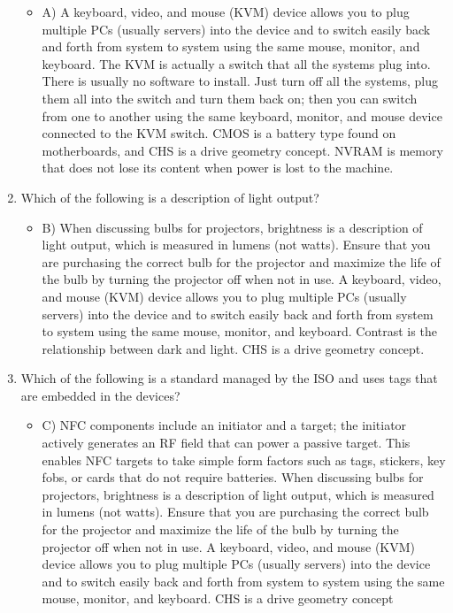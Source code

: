 \documentclass{article}
\begin{document}
\begin{enumerate}
    \begin{itemize}
        \item A) A keyboard, video, and mouse (KVM) device allows you to plug multiple PCs (usually servers) into the device and to switch easily back and forth from system to system using the same mouse, monitor, and keyboard. The KVM is actually a switch that all the systems plug into. There is usually no software to install. Just turn off all the systems, plug them all into the switch and turn them back on; then you can switch from one to another using the same keyboard, monitor, and mouse device connected to the KVM switch. CMOS is a battery type found on motherboards, and CHS is a drive geometry concept. NVRAM is memory that does not lose its content when power is lost to the machine.
    \end{itemize}
    \item Which of the following is a description of light output?
    \begin{itemize}
        \item B) When discussing bulbs for projectors, brightness is a description of light output, which is measured in lumens (not watts). Ensure that you are purchasing the correct bulb for the projector and maximize the life of the bulb by turning the projector off when not in use. A keyboard, video, and mouse (KVM) device allows you to plug multiple PCs (usually servers) into the device and to switch easily back and forth from system to system using the same mouse, monitor, and keyboard. Contrast is the relationship between dark and light. CHS is a drive geometry concept.
    \end{itemize}
    \item Which of the following is a standard managed by the ISO and uses tags that are embedded
in the devices?
    \begin{itemize}
        \item C) NFC components include an initiator and a target; the initiator actively generates an RF field that can power a passive target. This enables NFC targets to take simple form factors such as tags, stickers, key fobs, or cards that do not require batteries. When discussing bulbs for projectors, brightness is a description of light output, which is measured in lumens (not watts). Ensure that you are purchasing the correct bulb for the projector and maximize the life of the bulb by turning the projector off when not in use. A keyboard, video, and mouse (KVM) device allows you to plug multiple PCs (usually servers) into the device and to switch easily back and forth from system to system using the same mouse, monitor, and keyboard. CHS is a drive geometry concept

\end{itemize}
\end{enumerate}
\end{document}
